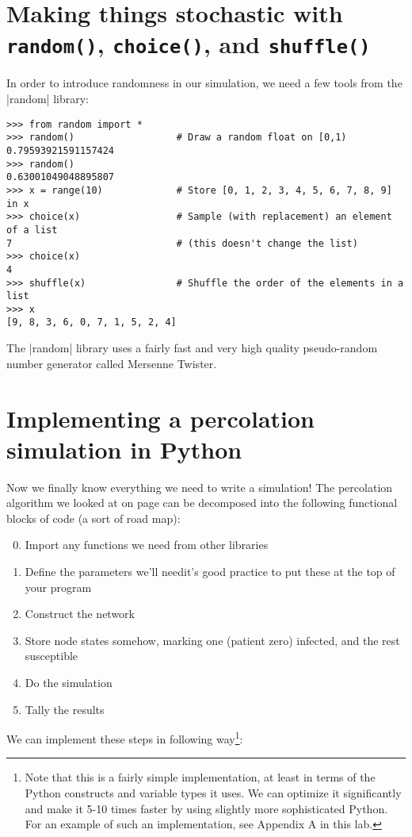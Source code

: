 \documentclass{article}
\begin{document}
\section{Making things stochastic with \texttt{random()}, \texttt{choice()}, and \texttt{shuffle()}}
In order to introduce randomness in our simulation, we need a few tools from the |random| library:

\begin{Verbatim}
>>> from random import *
>>> random()                  # Draw a random float on [0,1)
0.79593921591157424
>>> random()
0.63001049048895807
>>> x = range(10)             # Store [0, 1, 2, 3, 4, 5, 6, 7, 8, 9] in x
>>> choice(x)                 # Sample (with replacement) an element of a list 
7                             # (this doesn't change the list)
>>> choice(x)
4
>>> shuffle(x)                # Shuffle the order of the elements in a list
>>> x
[9, 8, 3, 6, 0, 7, 1, 5, 2, 4]
\end{Verbatim}

The |random| library uses a fairly fast and very high quality pseudo-random number generator called Mersenne Twister.

\pagebreak
\section{Implementing a percolation simulation in Python}
Now we finally know everything we need to write a simulation!  The percolation algorithm we looked at on page \pageref{perc} can be 
decomposed into the following functional blocks of code (a sort of road map):
\begin{enumerate}
\setcounter{enumi}{-1}
\item Import any functions we need from other libraries
\item Define the parameters we'll need\textemdash it's good practice to put these at the top of your program
\item Construct the network
\item Store node states somehow, marking one (patient zero) infected, and the rest susceptible
\item Do the simulation
\item Tally the results
\end{enumerate}

We can implement these steps in following way\footnote{Note that this is a fairly simple implementation, at least in terms of the Python constructs 
and variable types it uses.  We can optimize it significantly and make it 5-10 times faster by using slightly more sophisticated Python.  For an 
example of such an implementation, see Appendix A in this lab.}:
\end{document}
